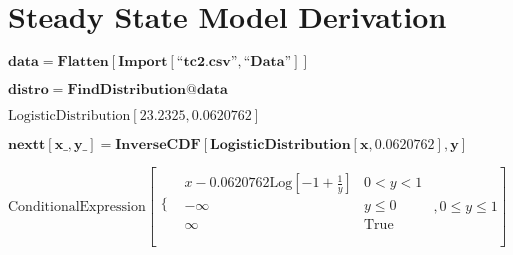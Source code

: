 
\usepackage{amsmath, amssymb, graphics, setspace}

\section{Steady State Model Derivation}\label{steady-state-model-code}

\begin{doublespace}
\noindent\(\pmb{\text{data} = \text{Flatten}[\text{Import}[\text{{``}tc2.csv{''}},\text{{``}Data{''}}]]}\)
\end{doublespace}

\begin{doublespace}
\noindent\(\pmb{\text{distro} = \text{FindDistribution}@\text{data}}\)
\end{doublespace}

\begin{doublespace}
\noindent\(\text{LogisticDistribution}[23.2325,0.0620762]\)
\end{doublespace}

\begin{doublespace}
\noindent\(\pmb{\text{nextt}[\text{x$\_$},\text{y$\_$}]=\text{InverseCDF}[\text{LogisticDistribution}[x,0.0620762],y]}\)
\end{doublespace}

\begin{doublespace}
\noindent\(\text{ConditionalExpression}\left[
\begin{array}{ll}
 \{ & 
\begin{array}{ll}
 x-0.0620762 \text{Log}\left[-1+\frac{1}{y}\right] & 0<y<1 \\
 -\infty  & y\leq 0 \\
 \infty  & \text{True} \\
\end{array}
 \\
\end{array}
,0\leq y\leq 1\right]\)
\end{doublespace}

